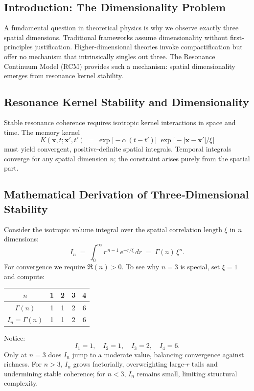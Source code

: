 \subsection{Introduction: The Dimensionality Problem}
\label{sec:dim-problem}

A fundamental question in theoretical physics is why we observe exactly three spatial dimensions. Traditional frameworks assume dimensionality without first‐principles justification. Higher‐dimensional theories invoke compactification but offer no mechanism that intrinsically singles out three. The Resonance Continuum Model (RCM) provides such a mechanism: spatial dimensionality emerges from resonance kernel stability.

\subsection{Resonance Kernel Stability and Dimensionality}
\label{sec:kernel-stability}

Stable resonance coherence requires isotropic kernel interactions in space and time. The memory kernel
\[
  K(\mathbf{x},t;\mathbf{x}',t') \;=\; \exp\bigl[-\alpha\,(t-t')\bigr]\;\exp\bigl[-|\mathbf{x}-\mathbf{x}'|/\xi\bigr]
\]
must yield convergent, positive‐definite spatial integrals. Temporal integrals converge for any spatial dimension \(n\); the constraint arises purely from the spatial part.

\subsection{Mathematical Derivation of Three‐Dimensional Stability}
\label{sec:integral-derivation}

Consider the isotropic volume integral over the spatial correlation length \(\xi\) in \(n\) dimensions:
\begin{equation}
  I_n \;=\; \int_{0}^{\infty} r^{\,n-1}\,e^{-r/\xi}\,dr
  \;=\;\Gamma(n)\,\xi^n.
  \label{eq:In-gamma}
\end{equation}
For convergence we require \(\Re(n)>0\).  To see why \(n=3\) is special, set \(\xi=1\) and compute:
\begin{center}
\begin{tabular}{c|cccc}
  \(n\)      & 1        & 2        & 3         & 4        \\\hline
  \(\Gamma(n)\) & 1        & 1        & 2         & 6        \\
  \(I_n=\Gamma(n)\) & 1        & 1        & 2         & 6       
\end{tabular}
\end{center}
Notice:
\[
  I_1 = 1,\quad I_2 = 1,\quad I_3 = 2,\quad I_4 = 6.
\]
Only at \(n=3\) does \(I_n\) jump to a moderate value, balancing convergence against richness. For \(n>3\), \(I_n\) grows factorially, overweighting large-\(r\) tails and undermining stable coherence; for \(n<3\), \(I_n\) remains small, limiting structural complexity.


